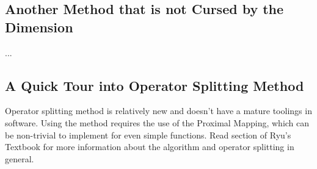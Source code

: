 \documentclass[11pt]{article}
\theoremstyle{definition}
\numberwithin{equation}{subsection}
\begin{document}
    \subsection{Another Method that is not Cursed by the Dimension}
        ...
    \subsection{A Quick Tour into Operator Splitting Method}
        Operator splitting method is relatively new and doesn't have a mature toolings in software. 
        Using the method requires the use of the Proximal Mapping, which can be non-trivial to implement for even simple functions. 
        Read section \cite[section 2.7]{ryu_large-scale_2022} of Ryu's Textbook for more information about the algorithm and operator splitting in general. 
        
        
\end{document}

